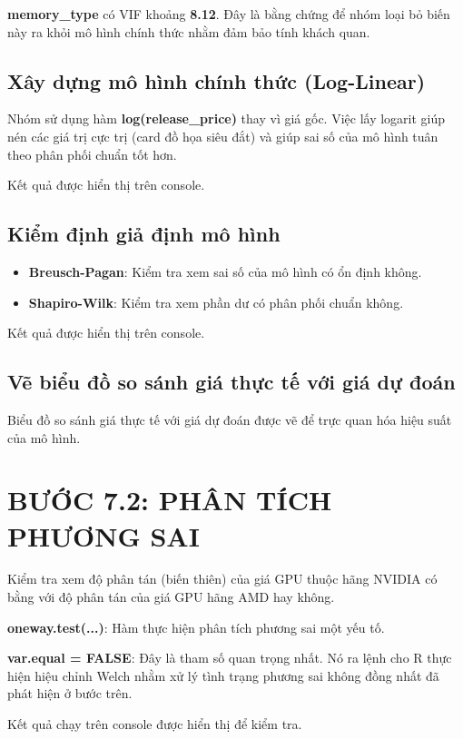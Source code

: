 \documentclass[12pt,a4paper]{article}
\begin{document}
\textbf{memory\_type} có VIF khoảng \textbf{8.12}. Đây là bằng chứng để nhóm loại bỏ biến này ra khỏi mô hình chính thức nhằm đảm bảo tính khách quan.

\subsection{Xây dựng mô hình chính thức (Log-Linear)}

Nhóm sử dụng hàm \textbf{log(release\_price)} thay vì giá gốc. Việc lấy logarit giúp nén các giá trị cực trị (card đồ họa siêu đắt) và giúp sai số của mô hình tuân theo phân phối chuẩn tốt hơn.

Kết quả được hiển thị trên console.

\subsection{Kiểm định giả định mô hình}

\begin{itemize}
    \item \textbf{Breusch-Pagan}: Kiểm tra xem sai số của mô hình có ổn định không.
    
    \item \textbf{Shapiro-Wilk}: Kiểm tra xem phần dư có phân phối chuẩn không.
\end{itemize}

Kết quả được hiển thị trên console.

\subsection{Vẽ biểu đồ so sánh giá thực tế với giá dự đoán}

Biểu đồ so sánh giá thực tế với giá dự đoán được vẽ để trực quan hóa hiệu suất của mô hình.

\section{BƯỚC 7.2: PHÂN TÍCH PHƯƠNG SAI}

Kiểm tra xem độ phân tán (biến thiên) của giá GPU thuộc hãng NVIDIA có bằng với độ phân tán của giá GPU hãng AMD hay không.

\textbf{oneway.test(...)}: Hàm thực hiện phân tích phương sai một yếu tố.

\textbf{var.equal = FALSE}: Đây là tham số quan trọng nhất. Nó ra lệnh cho R thực hiện hiệu chỉnh Welch nhằm xử lý tình trạng phương sai không đồng nhất đã phát hiện ở bước trên.

Kết quả chạy trên console được hiển thị để kiểm tra.
\end{document}
